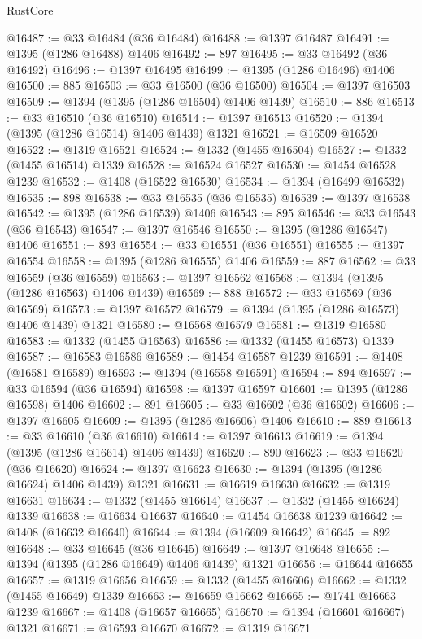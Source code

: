 \begin{lexlean}{RustCore}
\begin{coremodule}
@16487 := @33 @16484 (@36 @16484)
@16488 := @1397 @16487
@16491 := @1395 (@1286 @16488) @1406
@16492 := 897
@16495 := @33 @16492 (@36 @16492)
@16496 := @1397 @16495
@16499 := @1395 (@1286 @16496) @1406
@16500 := 885
@16503 := @33 @16500 (@36 @16500)
@16504 := @1397 @16503
@16509 := @1394 (@1395 (@1286 @16504) @1406 @1439)
@16510 := 886
@16513 := @33 @16510 (@36 @16510)
@16514 := @1397 @16513
@16520 := @1394 (@1395 (@1286 @16514) @1406 @1439) @1321
@16521 := @16509 @16520
@16522 := @1319 @16521
@16524 := @1332 (@1455 @16504)
@16527 := @1332 (@1455 @16514) @1339
@16528 := @16524 @16527
@16530 := @1454 @16528 @1239
@16532 := @1408 (@16522 @16530)
@16534 := @1394 (@16499 @16532)
@16535 := 898
@16538 := @33 @16535 (@36 @16535)
@16539 := @1397 @16538
@16542 := @1395 (@1286 @16539) @1406
@16543 := 895
@16546 := @33 @16543 (@36 @16543)
@16547 := @1397 @16546
@16550 := @1395 (@1286 @16547) @1406
@16551 := 893
@16554 := @33 @16551 (@36 @16551)
@16555 := @1397 @16554
@16558 := @1395 (@1286 @16555) @1406
@16559 := 887
@16562 := @33 @16559 (@36 @16559)
@16563 := @1397 @16562
@16568 := @1394 (@1395 (@1286 @16563) @1406 @1439)
@16569 := 888
@16572 := @33 @16569 (@36 @16569)
@16573 := @1397 @16572
@16579 := @1394 (@1395 (@1286 @16573) @1406 @1439) @1321
@16580 := @16568 @16579
@16581 := @1319 @16580
@16583 := @1332 (@1455 @16563)
@16586 := @1332 (@1455 @16573) @1339
@16587 := @16583 @16586
@16589 := @1454 @16587 @1239
@16591 := @1408 (@16581 @16589)
@16593 := @1394 (@16558 @16591)
@16594 := 894
@16597 := @33 @16594 (@36 @16594)
@16598 := @1397 @16597
@16601 := @1395 (@1286 @16598) @1406
@16602 := 891
@16605 := @33 @16602 (@36 @16602)
@16606 := @1397 @16605
@16609 := @1395 (@1286 @16606) @1406
@16610 := 889
@16613 := @33 @16610 (@36 @16610)
@16614 := @1397 @16613
@16619 := @1394 (@1395 (@1286 @16614) @1406 @1439)
@16620 := 890
@16623 := @33 @16620 (@36 @16620)
@16624 := @1397 @16623
@16630 := @1394 (@1395 (@1286 @16624) @1406 @1439) @1321
@16631 := @16619 @16630
@16632 := @1319 @16631
@16634 := @1332 (@1455 @16614)
@16637 := @1332 (@1455 @16624) @1339
@16638 := @16634 @16637
@16640 := @1454 @16638 @1239
@16642 := @1408 (@16632 @16640)
@16644 := @1394 (@16609 @16642)
@16645 := 892
@16648 := @33 @16645 (@36 @16645)
@16649 := @1397 @16648
@16655 := @1394 (@1395 (@1286 @16649) @1406 @1439) @1321
@16656 := @16644 @16655
@16657 := @1319 @16656
@16659 := @1332 (@1455 @16606)
@16662 := @1332 (@1455 @16649) @1339
@16663 := @16659 @16662
@16665 := @1741 @16663 @1239
@16667 := @1408 (@16657 @16665)
@16670 := @1394 (@16601 @16667) @1321
@16671 := @16593 @16670
@16672 := @1319 @16671

\end{coremodule}
\end{lexlean}
